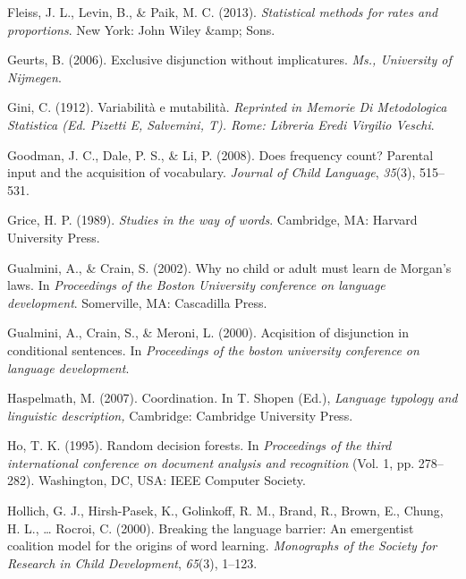 \documentclass[,man,floatsintext]{apa6}
\begin{document}
\leavevmode\hypertarget{ref-fleiss2013statistical}{}%
Fleiss, J. L., Levin, B., \& Paik, M. C. (2013). \emph{Statistical methods for rates and proportions}. New York: John Wiley \&amp; Sons.

\leavevmode\hypertarget{ref-geurts2006exclusive}{}%
Geurts, B. (2006). Exclusive disjunction without implicatures. \emph{Ms., University of Nijmegen}.

\leavevmode\hypertarget{ref-gini1912variabilita}{}%
Gini, C. (1912). Variabilità e mutabilità. \emph{Reprinted in Memorie Di Metodologica Statistica (Ed. Pizetti E, Salvemini, T). Rome: Libreria Eredi Virgilio Veschi}.

\leavevmode\hypertarget{ref-goodman2008does}{}%
Goodman, J. C., Dale, P. S., \& Li, P. (2008). Does frequency count? Parental input and the acquisition of vocabulary. \emph{Journal of Child Language}, \emph{35}(3), 515--531.

\leavevmode\hypertarget{ref-grice1989studies}{}%
Grice, H. P. (1989). \emph{Studies in the way of words}. Cambridge, MA: Harvard University Press.

\leavevmode\hypertarget{ref-gualminicrain2002}{}%
Gualmini, A., \& Crain, S. (2002). Why no child or adult must learn de Morgan's laws. In \emph{Proceedings of the Boston University conference on language development}. Somerville, MA: Cascadilla Press.

\leavevmode\hypertarget{ref-gualmini2000}{}%
Gualmini, A., Crain, S., \& Meroni, L. (2000). Acqisition of disjunction in conditional sentences. In \emph{Proceedings of the boston university conference on language development}.

\leavevmode\hypertarget{ref-haspelmath2007}{}%
Haspelmath, M. (2007). Coordination. In T. Shopen (Ed.), \emph{Language typology and linguistic description,} Cambridge: Cambridge University Press.

\leavevmode\hypertarget{ref-ho1995random}{}%
Ho, T. K. (1995). Random decision forests. In \emph{Proceedings of the third international conference on document analysis and recognition} (Vol. 1, pp. 278--282). Washington, DC, USA: IEEE Computer Society.

\leavevmode\hypertarget{ref-hollich2000breaking}{}%
Hollich, G. J., Hirsh-Pasek, K., Golinkoff, R. M., Brand, R., Brown, E., Chung, H. L., \ldots{} Rocroi, C. (2000). Breaking the language barrier: An emergentist coalition model for the origins of word learning. \emph{Monographs of the Society for Research in Child Development}, \emph{65}(3), 1--123.
\end{document}
